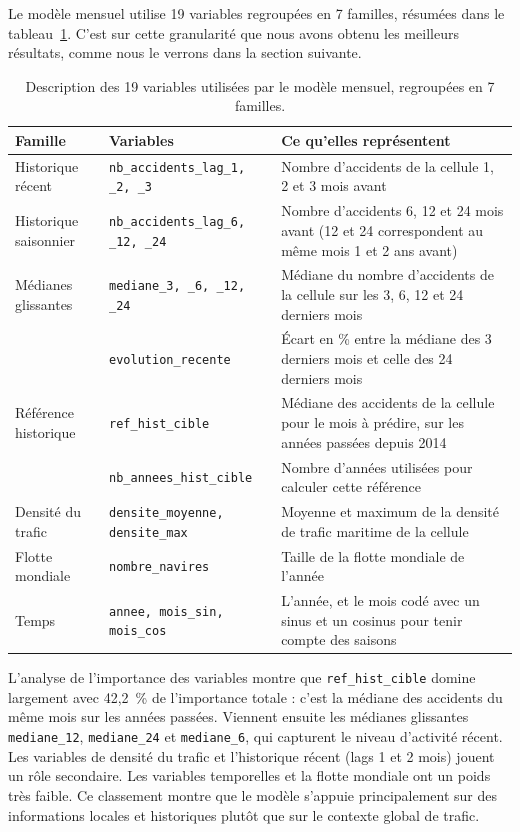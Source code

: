\documentclass[12pt, a4paper]{report}
\begin{document}
Le modèle mensuel utilise 19 variables regroupées en 7 familles, résumées dans le tableau~\ref{tab:variables}. C'est sur cette granularité que nous avons obtenu les meilleurs résultats, comme nous le verrons dans la section suivante.
\begin{table}[H]
  \centering
  \small
  \setlength{\tabcolsep}{5pt}
  \begin{tabular}{p{3cm} p{5cm} p{6cm}}
    \toprule
    \textbf{Famille} & \textbf{Variables} & \textbf{Ce qu'elles représentent} \\
    \midrule
    Historique récent & \texttt{nb\_accidents\_lag\_1, \_2, \_3} & Nombre d'accidents de la cellule 1, 2 et 3 mois avant \\
    \addlinespace
    Historique saisonnier & \texttt{nb\_accidents\_lag\_6, \_12, \_24} & Nombre d'accidents 6, 12 et 24 mois avant (12 et 24 correspondent au même mois 1 et 2 ans avant) \\
    \addlinespace
    Médianes glissantes & \texttt{mediane\_3, \_6, \_12, \_24} & Médiane du nombre d'accidents de la cellule sur les 3, 6, 12 et 24 derniers mois \\
    \addlinespace
     & \texttt{evolution\_recente} & Écart en \% entre la médiane des 3 derniers mois et celle des 24 derniers mois \\
    \addlinespace
    Référence historique & \texttt{ref\_hist\_cible} & Médiane des accidents de la cellule pour le mois à prédire, sur les années passées depuis 2014 \\
    \addlinespace
     & \texttt{nb\_annees\_hist\_cible} & Nombre d'années utilisées pour calculer cette référence \\
    \addlinespace
    Densité du trafic & \texttt{densite\_moyenne, densite\_max} & Moyenne et maximum de la densité de trafic maritime de la cellule \\
    \addlinespace
    Flotte mondiale & \texttt{nombre\_navires} & Taille de la flotte mondiale de l'année \\
    \addlinespace
    Temps & \texttt{annee, mois\_sin, mois\_cos} & L'année, et le mois codé avec un sinus et un cosinus pour tenir compte des saisons \\
    \bottomrule
  \end{tabular}
  \caption{Description des 19 variables utilisées par le modèle mensuel, regroupées en 7 familles.}
  \label{tab:variables}
\end{table}

L'analyse de l'importance des variables montre que \texttt{ref\_hist\_cible} domine largement avec 42,2~\% de l'importance totale : c'est la médiane des accidents du même mois sur les années passées. Viennent ensuite les médianes glissantes \texttt{mediane\_12}, \texttt{mediane\_24} et \texttt{mediane\_6}, qui capturent le niveau d'activité récent. Les variables de densité du trafic et l'historique récent (lags 1 et 2 mois) jouent un rôle secondaire. Les variables temporelles et la flotte mondiale ont un poids très faible. Ce classement montre que le modèle s'appuie principalement sur des informations locales et historiques plutôt que sur le contexte global de trafic.
\end{document}
